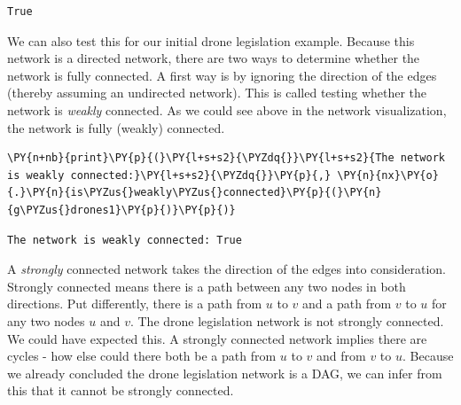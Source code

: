             \begin{tcolorbox}[breakable, size=fbox, boxrule=.5pt, pad at break*=1mm, opacityfill=0]
\begin{Verbatim}[commandchars=\\\{\}]
True
\end{Verbatim}
\end{tcolorbox}
        
    We can also test this for our initial drone legislation example. Because
this network is a directed network, there are two ways to determine
whether the network is fully connected. A first way is by ignoring the
direction of the edges (thereby assuming an undirected network). This is
called testing whether the network is \emph{weakly} connected. As we
could see above in the network visualization, the network is fully
(weakly) connected.

    \begin{tcolorbox}[breakable, size=fbox, boxrule=1pt, pad at break*=1mm,colback=cellbackground, colframe=cellborder]
\begin{Verbatim}[commandchars=\\\{\}]
\PY{n+nb}{print}\PY{p}{(}\PY{l+s+s2}{\PYZdq{}}\PY{l+s+s2}{The network is weakly connected:}\PY{l+s+s2}{\PYZdq{}}\PY{p}{,} \PY{n}{nx}\PY{o}{.}\PY{n}{is\PYZus{}weakly\PYZus{}connected}\PY{p}{(}\PY{n}{g\PYZus{}drones1}\PY{p}{)}\PY{p}{)}
\end{Verbatim}
\end{tcolorbox}

    \begin{Verbatim}[commandchars=\\\{\}]
The network is weakly connected: True
    \end{Verbatim}

    A \emph{strongly} connected network takes the direction of the edges
into consideration. Strongly connected means there is a path between any
two nodes in both directions. Put differently, there is a path from
\(u\) to \(v\) and a path from \(v\) to \(u\) for any two nodes \(u\)
and \(v\). The drone legislation network is not strongly connected. We
could have expected this. A strongly connected network implies there are
cycles - how else could there both be a path from \(u\) to \(v\) and
from \(v\) to \(u\). Because we already concluded the drone legislation
network is a DAG, we can infer from this that it cannot be strongly
connected.

